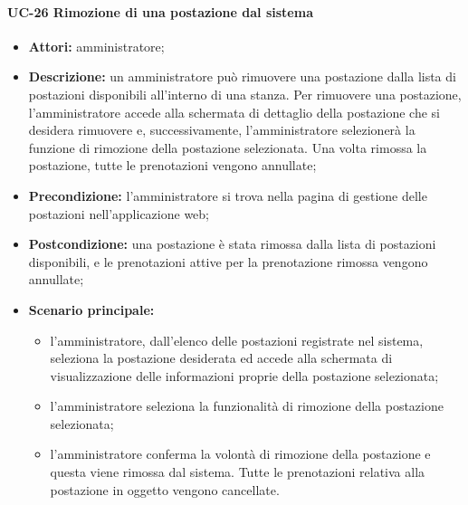 \paragraph{UC-26 Rimozione di una postazione dal sistema}
\begin{itemize}
    \item \textbf{Attori:} amministratore;
    \item \textbf{Descrizione:} un amministratore pu\`{o} rimuovere una postazione dalla lista di postazioni disponibili all'interno di una stanza. Per rimuovere una postazione, l'amministratore accede alla schermata di dettaglio della postazione che si desidera rimuovere e, successivamente, l'amministratore selezionerà la funzione di rimozione della postazione selezionata. Una volta rimossa la postazione, tutte le prenotazioni vengono annullate;
    \item \textbf{Precondizione:} l'amministratore si trova nella pagina di gestione delle postazioni nell'applicazione web;
    \item \textbf{Postcondizione:} una postazione \`{e} stata rimossa dalla lista di postazioni disponibili, e le prenotazioni attive per la prenotazione rimossa vengono annullate;
    \item \textbf{Scenario principale:}
    \begin{itemize}
        \item l'amministratore, dall'elenco delle postazioni registrate nel sistema, seleziona la postazione desiderata ed accede alla schermata di visualizzazione delle informazioni proprie della postazione selezionata;
        \item l'amministratore seleziona la funzionalità di rimozione della postazione selezionata;
        \item l'amministratore conferma la volontà di rimozione della postazione e questa viene rimossa dal sistema. Tutte le prenotazioni relativa alla postazione in oggetto vengono cancellate.
    \end{itemize}
\end{itemize}

